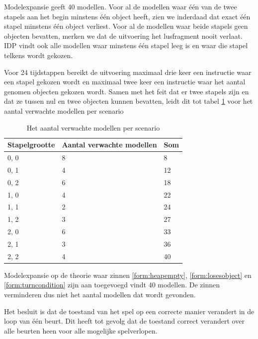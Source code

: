 Modelexpansie geeft 40 modellen. Voor al de modellen waar \'e\'en van de twee stapels aan het begin minstens \'e\'en object heeft, zien we inderdaad dat exact \'e\'en stapel minstens \'e\'en object verliest. Voor al de modellen waar beide stapels geen objecten bevatten, merken we dat de uitvoering het lusfragment nooit verlaat. IDP vindt ook alle modellen waar minstens \'e\'en stapel leeg is en waar die stapel telkens wordt gekozen. 

Voor 24 tijdstappen bereikt de uitvoering maximaal drie keer een instructie waar een stapel gekozen wordt en maximaal twee keer een instructie waar het aantal genomen objecten gekozen wordt. Samen met het feit dat er twee stapels zijn en dat ze tussen nul en twee objecten kunnen bevatten, leidt dit tot tabel \ref{tbl:exp-models} voor het aantal verwachte modellen per scenario

\begin{table}[]
	\centering
	\begin{tabular}{|l|l|l|}
\hline
Stapelgrootte & Aantal verwachte modellen & Som \\ \hline
0, 0          & 8                         & 8   \\ \hline
0, 1          & 4                         & 12  \\ \hline
0, 2          & 6                         & 18  \\ \hline
1, 0          & 4                         & 22  \\ \hline
1, 1          & 2                         & 24  \\ \hline
1, 2          & 3                         & 27  \\ \hline
2, 0          & 6                         & 33  \\ \hline
2, 1          & 3                         & 36  \\ \hline
2, 2          & 4                         & 40  \\ \hline
\end{tabular}
	\caption{Het aantal verwachte modellen per scenario}
	\label{tbl:exp-models}
\end{table}

Modelexpansie op de theorie waar zinnen \ref{form:heapempty}, \ref{form:losesobject} en \ref{form:turncondition} zijn aan toegevoegd vindt 40 modellen. De zinnen verminderen dus niet het aantal modellen dat wordt gevonden.

Het besluit is dat de toestand van het spel op een correcte manier verandert in de loop van \'e\'en beurt. Dit heeft tot gevolg dat de toestand correct verandert over alle beurten heen voor alle mogelijke spelverlopen.

